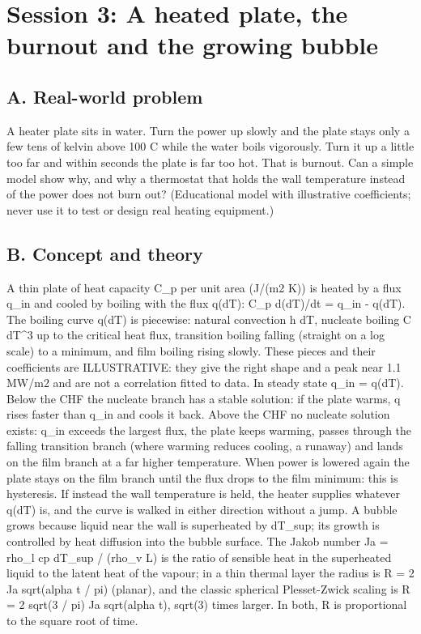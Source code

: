 \documentclass[11pt,a4paper]{article}
\begin{document}
\section{Session 3: A heated plate, the burnout and the growing bubble}

\subsection*{A. Real-world problem}
A heater plate sits in water. Turn the power up slowly and the plate stays only a few tens of kelvin above 100 C while the water boils vigorously. Turn it up a little too far and within seconds the plate is far too hot. That is burnout. Can a simple model show why, and why a thermostat that holds the wall temperature instead of the power does not burn out? (Educational model with illustrative coefficients; never use it to test or design real heating equipment.)

\subsection*{B. Concept and theory}
A thin plate of heat capacity C\_p per unit area (J/(m2 K)) is heated by a flux q\_in and cooled by boiling with the flux q(dT): C\_p d(dT)/dt = q\_in - q(dT). The boiling curve q(dT) is piecewise: natural convection h dT, nucleate boiling C dT\textasciicircum{}3 up to the critical heat flux, transition boiling falling (straight on a log scale) to a minimum, and film boiling rising slowly. These pieces and their coefficients are ILLUSTRATIVE: they give the right shape and a peak near 1.1 MW/m2 and are not a correlation fitted to data. In steady state q\_in = q(dT). Below the CHF the nucleate branch has a stable solution: if the plate warms, q rises faster than q\_in and cools it back. Above the CHF no nucleate solution exists: q\_in exceeds the largest flux, the plate keeps warming, passes through the falling transition branch (where warming reduces cooling, a runaway) and lands on the film branch at a far higher temperature. When power is lowered again the plate stays on the film branch until the flux drops to the film minimum: this is hysteresis. If instead the wall temperature is held, the heater supplies whatever q(dT) is, and the curve is walked in either direction without a jump. A bubble grows because liquid near the wall is superheated by dT\_sup; its growth is controlled by heat diffusion into the bubble surface. The Jakob number Ja = rho\_l cp dT\_sup / (rho\_v L) is the ratio of sensible heat in the superheated liquid to the latent heat of the vapour; in a thin thermal layer the radius is R = 2 Ja sqrt(alpha t / pi) (planar), and the classic spherical Plesset-Zwick scaling is R = 2 sqrt(3 / pi) Ja sqrt(alpha t), sqrt(3) times larger. In both, R is proportional to the square root of time.
\end{document}
